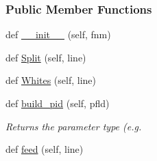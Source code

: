 \subsubsection*{Public Member Functions}
\begin{DoxyCompactItemize}
\item 
def \hyperlink{classsrc_1_1amberio_1_1FrcMod__Reader_ae02ce386979c358fc0d787aeba26b075}{\+\_\+\+\_\+init\+\_\+\+\_\+} (self, fnm)
\item 
def \hyperlink{classsrc_1_1amberio_1_1FrcMod__Reader_ab518c55f9e66b28b63cdda98b8cc0326}{Split} (self, line)
\item 
def \hyperlink{classsrc_1_1amberio_1_1FrcMod__Reader_a3921bf9a63d89bc3b9b325e2bf89a260}{Whites} (self, line)
\item 
def \hyperlink{classsrc_1_1amberio_1_1FrcMod__Reader_a63c8983b5014ae23c3b0fdc0ab4cf551}{build\+\_\+pid} (self, pfld)
\begin{DoxyCompactList}\small\item\em Returns the parameter type (e.\+g. \end{DoxyCompactList}\item 
def \hyperlink{classsrc_1_1amberio_1_1FrcMod__Reader_af04da824acce802babb9dca8efc01468}{feed} (self, line)
\end{DoxyCompactItemize}
